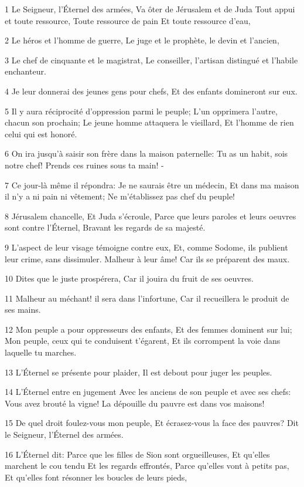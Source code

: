 \par 1 Le Seigneur, l'Éternel des armées, Va ôter de Jérusalem et de Juda Tout appui et toute ressource, Toute ressource de pain Et toute ressource d'eau,
\par 2 Le héros et l'homme de guerre, Le juge et le prophète, le devin et l'ancien,
\par 3 Le chef de cinquante et le magistrat, Le conseiller, l'artisan distingué et l'habile enchanteur.
\par 4 Je leur donnerai des jeunes gens pour chefs, Et des enfants domineront sur eux.
\par 5 Il y aura réciprocité d'oppression parmi le peuple; L'un opprimera l'autre, chacun son prochain; Le jeune homme attaquera le vieillard, Et l'homme de rien celui qui est honoré.
\par 6 On ira jusqu'à saisir son frère dans la maison paternelle: Tu as un habit, sois notre chef! Prends ces ruines sous ta main! -
\par 7 Ce jour-là même il répondra: Je ne saurais être un médecin, Et dans ma maison il n'y a ni pain ni vêtement; Ne m'établissez pas chef du peuple!
\par 8 Jérusalem chancelle, Et Juda s'écroule, Parce que leurs paroles et leurs oeuvres sont contre l'Éternel, Bravant les regards de sa majesté.
\par 9 L'aspect de leur visage témoigne contre eux, Et, comme Sodome, ils publient leur crime, sans dissimuler. Malheur à leur âme! Car ils se préparent des maux.
\par 10 Dites que le juste prospérera, Car il jouira du fruit de ses oeuvres.
\par 11 Malheur au méchant! il sera dans l'infortune, Car il recueillera le produit de ses mains.
\par 12 Mon peuple a pour oppresseurs des enfants, Et des femmes dominent sur lui; Mon peuple, ceux qui te conduisent t'égarent, Et ils corrompent la voie dans laquelle tu marches.
\par 13 L'Éternel se présente pour plaider, Il est debout pour juger les peuples.
\par 14 L'Éternel entre en jugement Avec les anciens de son peuple et avec ses chefs: Vous avez brouté la vigne! La dépouille du pauvre est dans vos maisons!
\par 15 De quel droit foulez-vous mon peuple, Et écrasez-vous la face des pauvres? Dit le Seigneur, l'Éternel des armées.
\par 16 L'Éternel dit: Parce que les filles de Sion sont orgueilleuses, Et qu'elles marchent le cou tendu Et les regards effrontés, Parce qu'elles vont à petits pas, Et qu'elles font résonner les boucles de leurs pieds,
